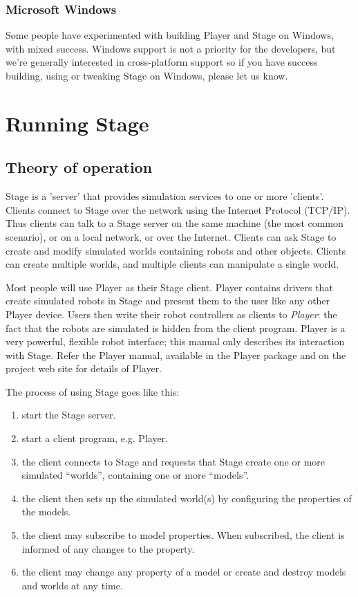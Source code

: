 \documentclass[letter,11pt,twoside]{report}
\begin{document}
\subsubsection{Microsoft Windows}
Some people have experimented with building Player and Stage on
Windows, with mixed success. Windows support is not a priority for the
developers, but we're generally interested in cross-platform support
so if you have success building, using or tweaking Stage on Windows,
please let us know.

\section{Running Stage}

\subsection{Theory of operation}

Stage is a 'server' that provides simulation services to one or more
'clients'. Clients connect to Stage over the network using the
Internet Protocol (TCP/IP). Thus clients can talk to a Stage server on
the same machine (the most common scenario), or on a local network, or
over the Internet. Clients can ask Stage to create and modify
simulated worlds containing robots and other objects. Clients can
create multiple worlds, and multiple clients can manipulate a single
world. 

Most people will use Player as their Stage client. Player contains
drivers that create simulated robots in Stage and present them to the
user like any other Player device. Users then write their robot
controllers as clients to {\em Player}: the fact that the robots are
simulated is hidden from the client program. Player is a very
powerful, flexible robot interface; this manual only describes its
interaction with Stage. Refer the Player manual, available in the
Player package and on the project web site for details of Player.

The process of using Stage goes like this:

\begin{enumerate}
\item start the Stage server.
\item start a client program, e.g. Player.
\item the client connects to Stage and requests that Stage create one
or more simulated ``worlds'', containing one or more ``models''.
\item the client then sets up the simulated world(s) by configuring
the properties of the models.
\item the client may subscribe to model properties. When subscribed,
the client is informed of any changes to the property.
\item the client may change any property of a model or create and
  destroy models and worlds at any time. 
\end{enumerate}
\end{document}
